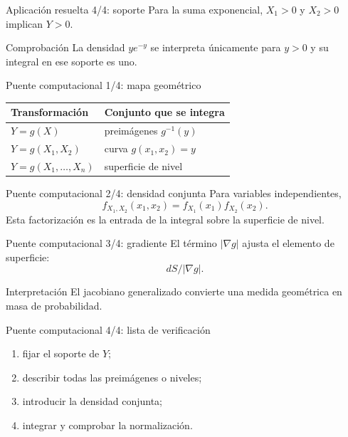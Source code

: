 \documentclass[10pt,aspectratio=169]{beamer}
\begin{document}
\begin{frame}{Aplicación resuelta 4/4: soporte}
  \footnotesize
  Para la suma exponencial, $X_1>0$ y $X_2>0$ implican $Y>0$.
  \begin{exampleblock}{Comprobación}
    La densidad $ye^{-y}$ se interpreta únicamente para $y>0$ y su integral en
    ese soporte es uno.
  \end{exampleblock}
\end{frame}

\begin{frame}{Puente computacional 1/4: mapa geométrico}
  \footnotesize
  \begin{tabular}{ll}
    \hline
    Transformación & Conjunto que se integra \\
    \hline
    $Y=g(X)$ & preimágenes $g^{-1}(y)$ \\
    $Y=g(X_1,X_2)$ & curva $g(x_1,x_2)=y$ \\
    $Y=g(X_1,\ldots,X_n)$ & superficie de nivel \\
    \hline
  \end{tabular}
\end{frame}

\begin{frame}{Puente computacional 2/4: densidad conjunta}
  \footnotesize
  Para variables independientes,
  \[
    f_{X_1,X_2}(x_1,x_2)=f_{X_1}(x_1)f_{X_2}(x_2).
  \]
  Esta factorización es la entrada de la integral sobre la superficie de nivel.
\end{frame}

\begin{frame}{Puente computacional 3/4: gradiente}
  \footnotesize
  El término $|\nabla g|$ ajusta el elemento de superficie:
  \[
    dS/|\nabla g|.
  \]
  \begin{block}{Interpretación}
    El jacobiano generalizado convierte una medida geométrica en masa de
    probabilidad.
  \end{block}
\end{frame}

\begin{frame}{Puente computacional 4/4: lista de verificación}
  \footnotesize
  \begin{enumerate}\itemsep=0.12cm
    \item fijar el soporte de $Y$;
    \item describir todas las preimágenes o niveles;
    \item introducir la densidad conjunta;
    \item integrar y comprobar la normalización.
  \end{enumerate}
\end{frame}
\end{document}
